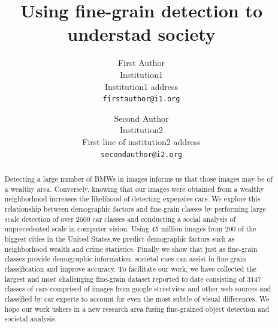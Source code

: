 \documentclass[10pt,twocolumn,letterpaper]{article}
\begin{document}
\title{Using fine-grain detection to understad society}

\author{First Author\\
Institution1\\
Institution1 address\\
{\tt\small firstauthor@i1.org}
\and
Second Author\\
Institution2\\
First line of institution2 address\\
{\tt\small secondauthor@i2.org}
}

\maketitle

\begin{abstract}
Detecting a large number of BMWs in images informs us that those images may be of a wealthy area. Conversely, knowing that our images were obtained from a wealthy neighborhood increases the likelihood of detecting expensive cars. We explore this relationship between demographic factors and fine-grain classes by performing large scale detection of over 2600 car classes and conducting a social analysis of unprecedented scale in computer vision. Using 45 million images from 200 of the biggest cities in the United States,we predict demographic factors such as neighborhood wealth and crime statistics. Finally we show that just as fine-grain classes provide demographic information, societal cues can assist in fine-grain classification and improve accuracy. To facilitate our work, we have collected the largest and most challenging fine-grain dataset reported to date consisting of 3147 classes of cars comprised of images from google streetview and other web sources and classified by car experts to account for even the most subtle of visual differences. We hope our work ushers in a new research area fusing fine-grained object detection and societal analysis.
\end{abstract}
\end{document}
